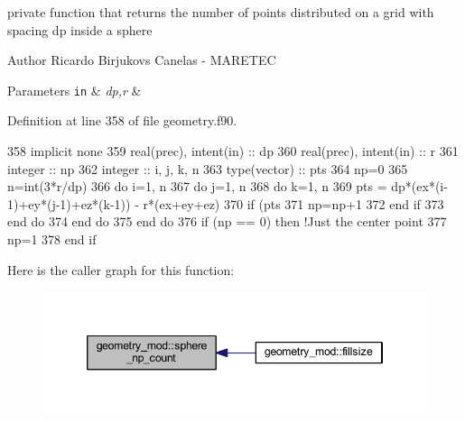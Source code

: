 private function that returns the number of points distributed on a grid with spacing dp inside a sphere 

\begin{DoxyAuthor}{Author}
Ricardo Birjukovs Canelas -\/ M\+A\+R\+E\+T\+EC 
\end{DoxyAuthor}

\begin{DoxyParams}[1]{Parameters}
\mbox{\tt in}  & {\em dp,r} & \\
\hline
\end{DoxyParams}


Definition at line 358 of file geometry.\+f90.


\begin{DoxyCode}
358     \textcolor{keywordtype}{implicit none}
359     \textcolor{keywordtype}{real(prec)}, \textcolor{keywordtype}{intent(in)} :: dp
360     \textcolor{keywordtype}{real(prec)}, \textcolor{keywordtype}{intent(in)} :: r
361     \textcolor{keywordtype}{integer} :: np
362     \textcolor{keywordtype}{integer} :: i, j, k, n
363     \textcolor{keywordtype}{type}(vector) :: pts
364     np=0
365     n=int(3*r/dp)
366     \textcolor{keywordflow}{do} i=1, n
367         \textcolor{keywordflow}{do} j=1, n
368             \textcolor{keywordflow}{do} k=1, n
369                 pts = dp*(ex*(i-1)+ey*(j-1)+ez*(k-1)) - r*(ex+ey+ez)
370                 \textcolor{keywordflow}{if} (pts%
371                     np=np+1
372 \textcolor{keywordflow}{                end if}
373 \textcolor{keywordflow}{            end do}
374 \textcolor{keywordflow}{        end do}
375 \textcolor{keywordflow}{    end do}
376     \textcolor{keywordflow}{if} (np == 0) \textcolor{keywordflow}{then} \textcolor{comment}{!Just the center point}
377         np=1
378 \textcolor{keywordflow}{    end if}
\end{DoxyCode}
Here is the caller graph for this function\+:\nopagebreak
\begin{figure}[H]
\begin{center}
\leavevmode
\includegraphics[width=346pt]{namespacegeometry__mod_a05de7940b4e7df5a2b31f3d0414e3743_icgraph}
\end{center}
\end{figure}


